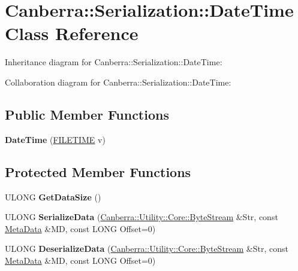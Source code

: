 \hypertarget{class_canberra_1_1_serialization_1_1_date_time}{}\section{Canberra\+:\+:Serialization\+:\+:Date\+Time Class Reference}
\label{class_canberra_1_1_serialization_1_1_date_time}


Inheritance diagram for Canberra\+:\+:Serialization\+:\+:Date\+Time\+:


Collaboration diagram for Canberra\+:\+:Serialization\+:\+:Date\+Time\+:
\subsection*{Public Member Functions}
\begin{DoxyCompactItemize}
\item 
\mbox{\label{class_canberra_1_1_serialization_1_1_date_time_a188654f95f0ba10aa38c94ef67ad1c9f}} 
{\bfseries Date\+Time} (\hyperlink{struct___f_i_l_e_t_i_m_e}{F\+I\+L\+E\+T\+I\+ME} v)
\end{DoxyCompactItemize}
\subsection*{Protected Member Functions}
\begin{DoxyCompactItemize}
\item 
\mbox{\label{class_canberra_1_1_serialization_1_1_date_time_acc1d09947faf677393b13ffafb8e9b5d}} 
U\+L\+O\+NG {\bfseries Get\+Data\+Size} ()
\item 
\mbox{\label{class_canberra_1_1_serialization_1_1_date_time_a004e8a1cd38602491adf1ab361a49df9}} 
U\+L\+O\+NG {\bfseries Serialize\+Data} (\hyperlink{class_canberra_1_1_utility_1_1_core_1_1_byte_stream}{Canberra\+::\+Utility\+::\+Core\+::\+Byte\+Stream} \&Str, const \hyperlink{class_canberra_1_1_serialization_1_1_meta_data}{Meta\+Data} \&MD, const L\+O\+NG Offset=0)
\item 
\mbox{\label{class_canberra_1_1_serialization_1_1_date_time_af318e60e88f4362c336021bee044e033}} 
U\+L\+O\+NG {\bfseries Deserialize\+Data} (\hyperlink{class_canberra_1_1_utility_1_1_core_1_1_byte_stream}{Canberra\+::\+Utility\+::\+Core\+::\+Byte\+Stream} \&Str, const \hyperlink{class_canberra_1_1_serialization_1_1_meta_data}{Meta\+Data} \&MD, const L\+O\+NG Offset=0)
\end{DoxyCompactItemize}
